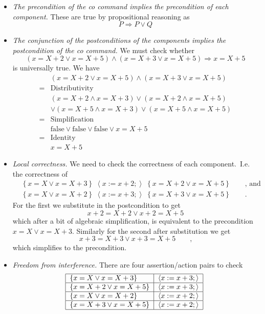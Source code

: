 \documentclass[11pt]{article}%
\begin{document}
\begin{itemize}
\item \emph{The precondition of the co command implies the precondition of
each component.} These are true by propositional reasoning as%
\[
P\Rightarrow P\vee Q
\]


\item \emph{The conjunction of the postconditions of the components implies
the postcondition of the co command.} We must check whether%
\[
\left(  x=X+2\vee x=X+5\right)  \wedge\left(  x=X+3\vee x=X+5\right)
\Rightarrow x=X+5
\]
is universally true. We have%
\begin{align*}
&  \left(  x=X+2\vee x=X+5\right)  \wedge\left(  x=X+3\vee x=X+5\right) \\
=  &  \text{Distributivity}\\
&  \left(  x=X+2\wedge x=X+3\right)  \vee\left(  x=X+2\wedge x=X+5\right) \\
&  \vee\left(  x=X+5\wedge x=X+3\right)  \vee\left(  x=X+5\wedge x=X+5\right)
\\
=  &  \text{Simplification}\\
&  \mathrm{false}\vee\mathrm{false}\vee\mathrm{false}\vee\left.  x=X+5\right.
\\
=  &  \text{Identity}\\
&  \left.  x=X+5\right.
\end{align*}


\item \emph{Local correctness.} We need to check the correctness of each
component.\ I.e. the correctness of%
\begin{align*}
&  \left\{  x=X\vee x=X+3\right\}  \;\left\langle x:=x+2;\right\rangle
\;\left\{  x=X+2\vee x=X+5\right\}  \qquad\text{, and}\\
&  \left\{  x=X\vee x=X+2\right\}  \;\left\langle x:=x+3;\right\rangle
\;\left\{  x=X+3\vee x=X+5\right\}  \qquad\text{.}%
\end{align*}
For the first we substitute in the postcondition to get%
\[
x+2=X+2\vee x+2=X+5
\]
which after a bit of algebraic simplification, is equivalent to the
precondition $x=X\vee x=X+3$. Similarly for the second after substitution we
get%
\[
x+3=X+3\vee x+3=X+5\qquad\text{,}%
\]
which simplifies to the precondition.

\item \emph{Freedom from interference.} There are four assertion/action pairs
to check%
\[%
\begin{tabular}
[c]{|l|l|}\hline
$\{x=X\vee x=X+3\}$ & $\left\langle x:=x+3;\right\rangle $\\\hline
$\{x=X+2\vee x=X+5\}$ & $\left\langle x:=x+3;\right\rangle $\\\hline
$\{x=X\vee x=X+2\}$ & $\left\langle x:=x+2;\right\rangle $\\\hline
$\{x=X+3\vee x=X+5\}$ & $\left\langle x:=x+2;\right\rangle $\\\hline
\end{tabular}
\
\]



\end{itemize}
\end{document}
